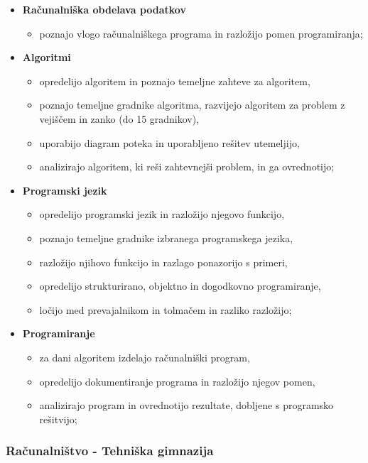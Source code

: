 \begin{itemize}
\tightlist
\item \textbf{Računalniška obdelava podatkov}
  \begin{itemize}
    \tightlist
  \item poznajo vlogo računalniškega programa in razložijo pomen programiranja;
  \end{itemize}
\item \textbf{Algoritmi}
  \begin{itemize}
    \tightlist
  \item  opredelijo algoritem in poznajo temeljne zahteve za algoritem,
  \item poznajo temeljne gradnike algoritma, razvijejo algoritem za
    problem z vejiščem in zanko (do 15 gradnikov),
  \item uporabijo diagram poteka in uporabljeno rešitev utemeljijo,
  \item analizirajo algoritem, ki reši zahtevnejši problem, in ga
    ovrednotijo;
  \end{itemize}
\item \textbf{Programski jezik}
  \begin{itemize}
    \tightlist
  \item opredelijo programski jezik in razložijo njegovo funkcijo,
  \item poznajo temeljne gradnike izbranega programskega jezika,
  \item razložijo njihovo funkcijo in razlago ponazorijo s primeri,
  \item opredelijo strukturirano, objektno in dogodkovno
    programiranje,
    \item ločijo med prevajalnikom in tolmačem in razliko razložijo;
  \end{itemize}
\item \textbf{Programiranje}
  \begin{itemize}
    \tightlist
  \item za dani algoritem izdelajo računalniški program,
  \item opredelijo dokumentiranje programa in razložijo njegov pomen,
  \item analizirajo program in ovrednotijo rezultate, dobljene s
     programsko rešitvijo;
  \end{itemize}
\end{itemize}

\subsubsection{Računalništvo - Tehniška gimnazija}

